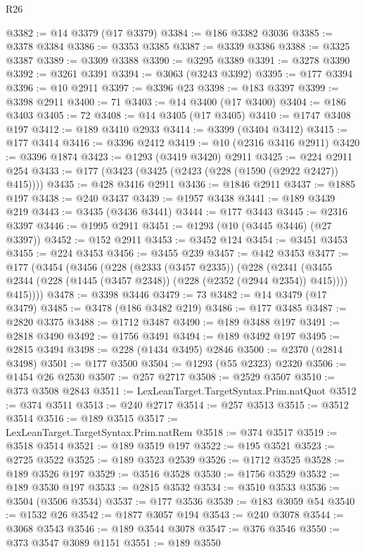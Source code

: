 \begin{lexlean}{R26}
\begin{coremodule}
@3382 := @14 @3379 (@17 @3379)
@3384 := @186 @3382 @3036
@3385 := @3378 @3384
@3386 := @3353 @3385
@3387 := @3339 @3386
@3388 := @3325 @3387
@3389 := @3309 @3388
@3390 := @3295 @3389
@3391 := @3278 @3390
@3392 := @3261 @3391
@3394 := @3063 (@3243 @3392)
@3395 := @177 @3394
@3396 := @10 @2911
@3397 := @3396 @23
@3398 := @183 @3397
@3399 := @3398 @2911
@3400 := 71
@3403 := @14 @3400 (@17 @3400)
@3404 := @186 @3403
@3405 := 72
@3408 := @14 @3405 (@17 @3405)
@3410 := @1747 @3408 @197
@3412 := @189 @3410 @2933
@3414 := @3399 (@3404 @3412)
@3415 := @177 @3414
@3416 := @3396 @2412
@3419 := @10 (@2316 @3416 @2911)
@3420 := @3396 @1874
@3423 := @1293 (@3419 @3420) @2911
@3425 := @224 @2911 @254
@3433 := @177 (@3423 (@3425 (@2423 (@228 (@1590 (@2922 @2427)) @415))))
@3435 := @428 @3416 @2911
@3436 := @1846 @2911
@3437 := @1885 @197
@3438 := @240 @3437
@3439 := @1957 @3438
@3441 := @189 @3439 @219
@3443 := @3435 (@3436 @3441)
@3444 := @177 @3443
@3445 := @2316 @3397
@3446 := @1995 @2911
@3451 := @1293 (@10 (@3445 @3446) (@27 @3397))
@3452 := @152 @2911
@3453 := @3452 @124
@3454 := @3451 @3453
@3455 := @224 @3453
@3456 := @3455 @239
@3457 := @442 @3453
@3477 := @177
    (@3454
      (@3456
        (@228
          (@2333 (@3457 @2335))
          (@228
            (@2341 (@3455 @2344 (@228 (@1445 (@3457 @2348)) (@228 (@2352 (@2944 @2354)) @415))))
            @415))))
@3478 := @3398 @3446
@3479 := 73
@3482 := @14 @3479 (@17 @3479)
@3485 := @3478 (@186 @3482 @219)
@3486 := @177 @3485
@3487 := @2820 @3375
@3488 := @1712 @3487
@3490 := @189 @3488 @197
@3491 := @2818 @3490
@3492 := @1756 @3491
@3494 := @189 @3492 @197
@3495 := @2815 @3494
@3498 := @228 (@1434 @3495) @2846
@3500 := @2370 (@2814 @3498)
@3501 := @177 @3500
@3504 := @1293 (@55 @2323) @2320
@3506 := @1454 @26 @2530
@3507 := @257 @2717
@3508 := @2529 @3507
@3510 := @373 @3508 @2843
@3511 := LexLeanTarget.TargetSyntax.Prim.natQuot
@3512 := @374 @3511
@3513 := @240 @2717
@3514 := @257 @3513
@3515 := @3512 @3514
@3516 := @189 @3515
@3517 := LexLeanTarget.TargetSyntax.Prim.natRem
@3518 := @374 @3517
@3519 := @3518 @3514
@3521 := @189 @3519 @197
@3522 := @195 @3521
@3523 := @2725 @3522
@3525 := @189 @3523 @2539
@3526 := @1712 @3525
@3528 := @189 @3526 @197
@3529 := @3516 @3528
@3530 := @1756 @3529
@3532 := @189 @3530 @197
@3533 := @2815 @3532
@3534 := @3510 @3533
@3536 := @3504 (@3506 @3534)
@3537 := @177 @3536
@3539 := @183 @3059 @54
@3540 := @1532 @26
@3542 := @1877 @3057 @194
@3543 := @240 @3078
@3544 := @3068 @3543
@3546 := @189 @3544 @3078
@3547 := @376 @3546
@3550 := @373 @3547 @3089 @1151
@3551 := @189 @3550

\end{coremodule}
\end{lexlean}

